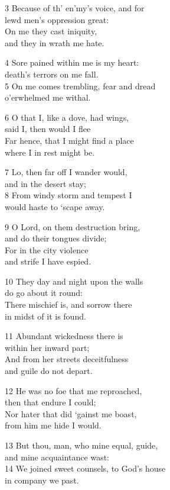 3 Because of th’ en’my’s voice, and for\\
lewd men’s oppression great:\\
On me they cast iniquity,\\
and they in wrath me hate.

4 Sore pained within me is my heart:\\
death’s terrors on me fall.\\
5 On me comes trembling, fear and dread\\
o’erwhelmed me withal.

6 O that I, like a dove, had wings,\\
said I, then would I flee\\
Far hence, that I might find a place\\
where I in rest might be.

7 Lo, then far off I wander would,\\
and in the desert stay;\\
8 From windy storm and tempest I\\
would haste to ‘scape away.

9 O Lord, on them destruction bring,\\
and do their tongues divide;\\
For in the city violence\\
and strife I have espied.

10 They day and night upon the walls\\
do go about it round:\\
There mischief is, and sorrow there\\
in midst of it is found.

11 Abundant wickedness there is\\
within her inward part;\\
And from her streets deceitfulness\\
and guile do not depart.

12 He was no foe that me reproached,\\
then that endure I could;\\
Nor hater that did ‘gainst me boast,\\
from him me hide I would.

13 But thou, man, who mine equal, guide,\\
and mine acquaintance wast:\\
14 We joined sweet counsels, to God’s house\\
in company we past.

